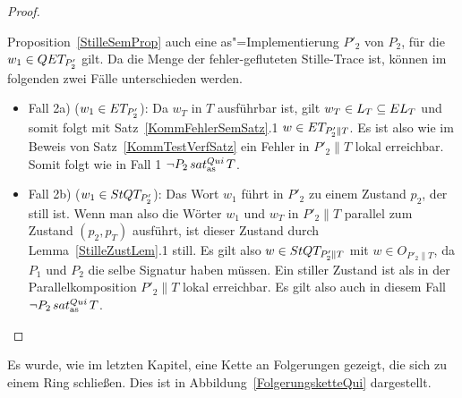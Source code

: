 \begin{proof}
\begin{itemize}
      Proposition~\ref{StilleSemProp} auch eine as"=Implementierung $P'_2$ von
      $P_2$, für die $w_1\in QET _{P'_2}$ gilt. Da die Menge \QET{} der
      fehler-gefluteten Stille-Trace ist, können im folgenden zwei Fälle
      unterschieden werden.
      \begin{itemize}
        \item Fall 2a) ($w_1\in ET _{P'_2}$): Da $w_T$ in $T$ ausführbar ist,
          gilt $w_T\in L_T\subseteq EL _T$ und somit folgt mit
          Satz~\ref{KommFehlerSemSatz}.1 $w\in ET _{P'_2\|T}$. Es ist also wie
          im Beweis von Satz~\ref{KommTestVerfSatz} ein Fehler in $P'_2\|T$
          lokal erreichbar. Somit folgt wie in Fall 1 $\neg P_2\hspace{0.05cm}sat_\mathrm{as}^{Qui}\hspace{0.05cm} T$.
        \item Fall 2b) ($w_1\in StQT _{P'_2}$): Das Wort $w_1$ führt in $P'_2$
          zu einem Zustand $p_2$, der still ist. Wenn man also die Wörter $w_1$
          und $w_T$ in $P'_2\|T$ parallel zum Zustand $(p_2,p_T)$ ausführt, ist
          dieser Zustand durch Lemma~\ref{StilleZustLem}.1 still. Es gilt also
          $w\in StQT _{P'_2\|T}$ mit $w\in O_{P'_2\|T}$, da $P_1$ und $P_2$ die
          selbe Signatur haben müssen. Ein stiller Zustand ist als in der
          Parallelkomposition $P'_2\|T$ lokal erreichbar. Es gilt also auch in
          diesem Fall $\neg P_2\hspace{0.05cm}sat_\mathrm{as}^{Qui}\hspace{0.05cm} T$.
      \end{itemize}
  \end{itemize}
\end{proof}

Es wurde, wie im letzten Kapitel, eine Kette an Folgerungen gezeigt, die
sich zu einem Ring schließen. Dies ist in Abbildung~\ref{FolgerungsketteQui}
dargestellt.

